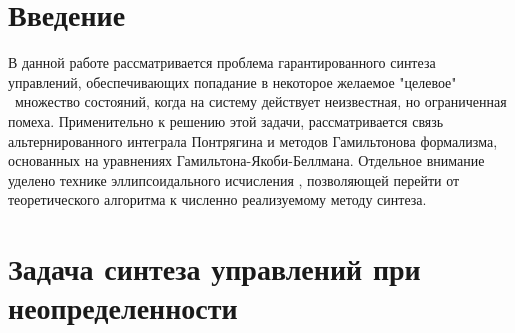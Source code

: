 \section{Введение}
В данной работе рассматривается проблема гарантированного синтеза управлений, обеспечивающих попадание в некоторое желаемое 
 "целевое" \ множество состояний, когда на систему действует неизвестная, но ограниченная помеха. Применительно к решению этой
 задачи, рассматривается связь альтернированного интеграла Понтрягина и методов Гамильтонова формализма, основанных на уравнениях
 Гамильтона-Якоби-Беллмана.
 Отдельное внимание уделено технике эллипсоидального исчисления \cite{ellips_calculus}, позволяющей перейти от теоретического алгоритма 
 к численно реализуемому методу синтеза.

\section{Задача синтеза управлений при неопределенности}

